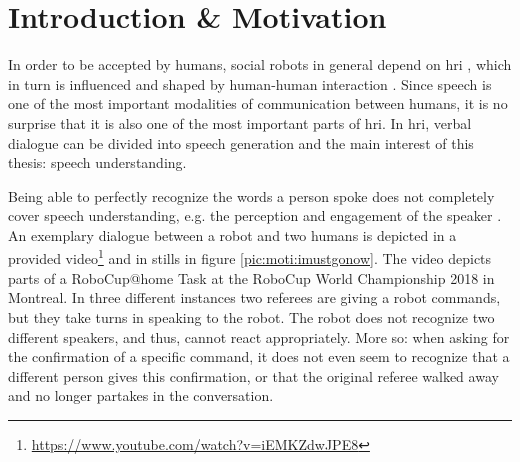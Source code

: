 
\chapter{Introduction \& Motivation}
\label{motiv:start}
In order to be accepted by humans, social robots in general depend on \gls{hri} \cite{6926324}, which in turn is influenced and shaped by human-human interaction \cite{mediaequation}.
Since speech is one of the most important modalities of communication between humans, it is no surprise that it is also one of the most important parts of \gls{hri}.
In \gls{hri}, verbal dialogue can be divided into speech generation and the main interest of this thesis: speech understanding.

Being able to perfectly recognize the words a person spoke does not completely cover speech understanding, e.g. the perception and engagement of the speaker \cite{Ivaldi2017}.
An exemplary dialogue between a robot and two humans is depicted in a provided video\footnote{\url{https://www.youtube.com/watch?v=iEMKZdwJPE8}} and in stills in figure \ref{pic:moti:imustgonow}.
The video depicts parts of a RoboCup@home Task at the RoboCup World Championship 2018 in Montreal.
In three different instances two referees are giving a robot commands, but they take turns in speaking to the robot.
The robot does not recognize two different speakers, and thus, cannot react appropriately.
More so:
when asking for the confirmation of a specific command, it does not even seem to recognize that a different person gives this confirmation, or that the original referee walked away and no longer partakes in the conversation.

